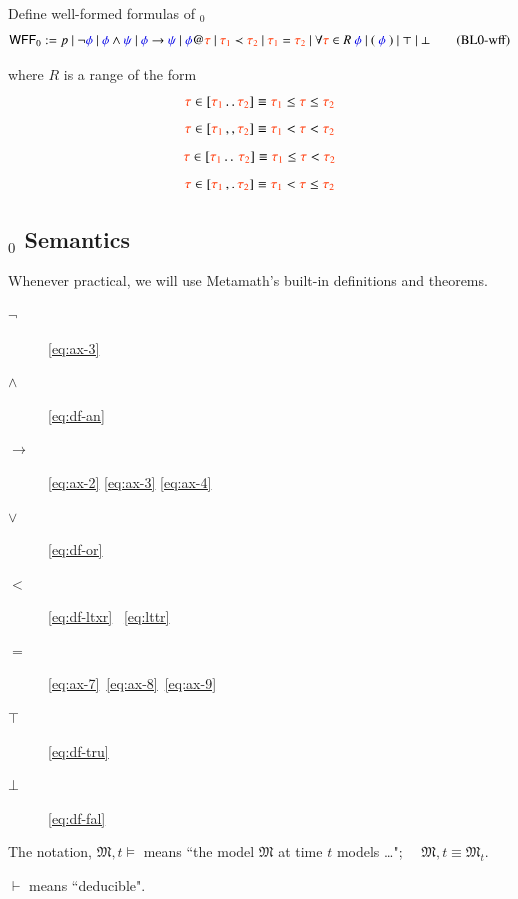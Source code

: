 \begin{definition} {Define well-formed formulas of \logicid$_0$}
\begin{align}
\mathsf{WFF}_0 := p~\vert~ \lnot\mw{\phi} ~\vert~ \mw{\phi} \wedge \mw{\psi}~\vert~\mw{\phi} \rightarrow \mw{\psi}~\vert~ \mw{\phi} @ \msc{\tau}~\vert~\msc{\tau_1} \prec \msc{\tau_2}~
  \vert~\msc{\tau_1}=\msc{\tau_2}~\vert~\forall \msc{\tau} \in R~\mw{\phi}~\vert~(~\mw{\phi}~)~\vert~\top~\vert~\bot \label{eq:bl0wff}\tag{BL0-wff}
\end{align}
\end{definition}
where $R$ is a range of the form  
\[\msc{\tau} \in [ \msc{\tau_1} \dotdot \msc{\tau_2} ] \equiv \msc{\tau_1} \le \msc{\tau} \le \msc{\tau_2} \]  
\[\msc{\tau} \in [ \msc{\tau_1} \commacomma \msc{\tau_2} ] \equiv \msc{\tau_1} < \msc{\tau} < \msc{\tau_2} \]  
\[\msc{\tau} \in [ \msc{\tau_1} \dotcomma \msc{\tau_2} ] \equiv \msc{\tau_1} \le \msc{\tau} < \msc{\tau_2} \]  
\[\msc{\tau} \in [ \msc{\tau_1} \commadot \msc{\tau_2} ] \equiv \msc{\tau_1} < \msc{\tau} \le \msc{\tau_2} \]


\subsection{\logicid$_0$ Semantics}\label{sec:bl0sem}

\pn Whenever practical, we will use Metamath's built-in definitions and theorems.
\begin{description}
\item[$\lnot$ ] \ref{eq:ax-3}
\item[$\wedge$ ] \ref{eq:df-an}
\item[$\rightarrow$ ]  \ref{eq:ax-2}  \ref{eq:ax-3}  \ref{eq:ax-4}
\item[$\vee$ ]  \ref{eq:df-or}
\item[$<$ ]  \ref{eq:df-ltxr}  ~\ref{eq:lttr}
\item[$=$ ]  \ref{eq:ax-7}~\ref{eq:ax-8}~\ref{eq:ax-9}
\item[$\top$ ]  \ref{eq:df-tru}
\item[$\bot$]  \ref{eq:df-fal}
\end{description}

\pn The notation, 
\(\mathfrak{M} , t \models\)
 means ``the model $\mathfrak{M}$ at time $t$ models \ldots";~~  \(\mathfrak{M} , t \equiv \mathfrak{M}_t\).

$\vdash$ means ``deducible".  

